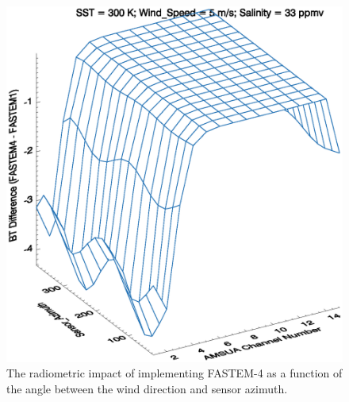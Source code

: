 \begin{figure}[htp]
  \centering
  \includegraphics[scale=0.75]{graphics/AMSUA_Sensor_Azimuth_BT.eps}
  \caption{The radiometric impact of implementing FASTEM-4 as a function of the angle between the wind direction and sensor azimuth.}
  \label{fig:AMSUA_Sensor_Azimuth_Impact}
\end{figure} 

%
%



